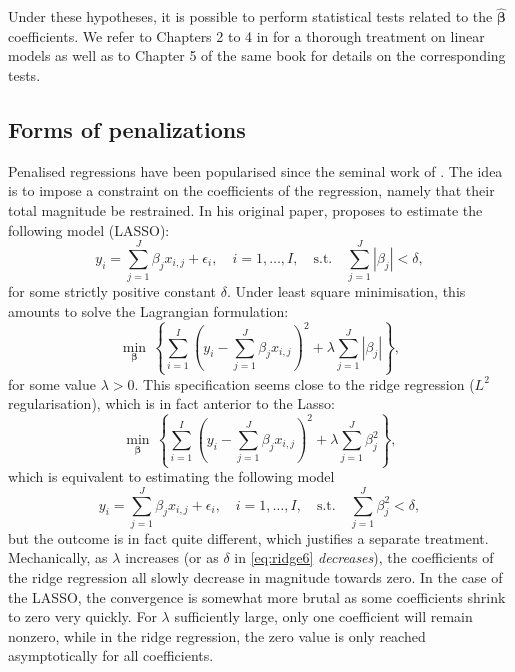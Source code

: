 \documentclass[]{krantz}
\theoremstyle{definition}
\theoremstyle{definition}
\theoremstyle{definition}
\theoremstyle{remark}
\begin{document}
Under these hypotheses, it is possible to perform statistical tests
related to the \(\hat{\boldsymbol{\beta}}\) coefficients. We refer to
Chapters 2 to 4 in \citet{greene2018econometric} for a thorough
treatment on linear models as well as to Chapter 5 of the same book for
details on the corresponding tests.

\hypertarget{forms-of-penalizations}{%
\subsection{Forms of penalizations}\label{forms-of-penalizations}}

Penalised regressions have been popularised since the seminal work of
\citet{tibshirani1996regression}. The idea is to impose a constraint on
the coefficients of the regression, namely that their total magnitude be
restrained. In his original paper, \citet{tibshirani1996regression}
proposes to estimate the following model (LASSO): \begin{equation}
\label{eq:lasso1}
y_i = \sum_{j=1}^J \beta_jx_{i,j} + \epsilon_i, \quad i =1,\dots,I, \quad \text{s.t.} \quad \sum_{j=1}^J |\beta_j| < \delta, 
\end{equation} for some strictly positive constant \(\delta\). Under
least square minimisation, this amounts to solve the Lagrangian
formulation: \begin{equation}
\label{eq:lasso2}
\underset{\mathbf{\beta}}{\min} \, \left\{ \sum_{i=1}^I\left(y_i - \sum_{j=1}^J \beta_jx_{i,j} \right)^2+\lambda \sum_{j=1}^J |\beta_j| \right\},
\end{equation} for some value \(\lambda>0\). This specification seems
close to the ridge regression (\(L^2\) regularisation), which is in fact
anterior to the Lasso: \begin{equation}
\label{eq:ridge}
\underset{\mathbf{\beta}}{\min} \, \left\{ \sum_{i=1}^I\left(y_i - \sum_{j=1}^J\beta_jx_{i,j} \right)^2+\lambda \sum_{j=1}^J \beta_j^2 \right\},
\end{equation} which is equivalent to estimating the following model
\begin{equation}
\label{eq:ridge6}
y_i = \sum_{j=1}^J \beta_jx_{i,j} + \epsilon_i, \quad i =1,\dots,I, \quad \text{s.t.} \quad \sum_{j=1}^J \beta_j^2 < \delta, 
\end{equation} but the outcome is in fact quite different, which
justifies a separate treatment. Mechanically, as \(\lambda\) increases
(or as \(\delta\) in \eqref{eq:ridge6} \emph{decreases}), the coefficients
of the ridge regression all slowly decrease in magnitude towards zero.
In the case of the LASSO, the convergence is somewhat more brutal as
some coefficients shrink to zero very quickly. For \(\lambda\)
sufficiently large, only one coefficient will remain nonzero, while in
the ridge regression, the zero value is only reached asymptotically for
all coefficients.
\end{document}
